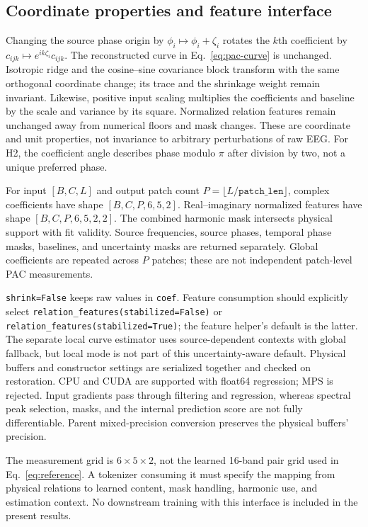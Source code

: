\documentclass[10pt,twocolumn,letterpaper]{article}
\begin{document}
\subsection{Coordinate properties and feature interface}
\label{app:operator-interface}
Changing the source phase origin by $\phi_i\mapsto\phi_i+\zeta_i$
rotates the $k$th coefficient by $c_{ijk}\mapsto
e^{ik\zeta_i}c_{ijk}$. The reconstructed curve in
Eq.~\ref{eq:pac-curve} is unchanged. Isotropic ridge and the
cosine--sine covariance block transform with the same orthogonal
coordinate change; its trace and the shrinkage weight remain invariant.
Likewise, positive input scaling multiplies the coefficients and
baseline by the scale and variance by its square. Normalized relation
features remain unchanged away from numerical floors and mask changes.
These are coordinate and unit properties, not invariance to arbitrary
perturbations of raw EEG. For H2, the coefficient angle describes phase
modulo $\pi$ after division by two, not a unique preferred phase.

For input $[B,C,L]$ and output patch count
$P=\lfloor L/\texttt{patch\_len}\rfloor$, complex coefficients have
shape $[B,C,P,6,5,2]$. Real--imaginary normalized features have shape
$[B,C,P,6,5,2,2]$. The combined harmonic mask intersects physical
support with fit validity. Source frequencies, source phases, temporal
phase masks, baselines, and uncertainty masks are returned separately.
Global coefficients are repeated across $P$ patches; these are not
independent patch-level PAC measurements.

\texttt{shrink=False} keeps raw values in \texttt{coef}. Feature
consumption should explicitly select
\texttt{relation\_features(stabilized=False)} or
\texttt{relation\_features(stabilized=True)}; the feature helper's
default is the latter. The separate local curve estimator uses
source-dependent contexts with global fallback, but local mode is not
part of this uncertainty-aware default. Physical buffers and constructor
settings are serialized together and checked on restoration.
CPU and CUDA are supported with float64 regression; MPS is rejected.
Input gradients pass through filtering and regression, whereas spectral
peak selection, masks, and the internal prediction score are not fully
differentiable. Parent mixed-precision conversion preserves the
physical buffers' precision.

The measurement grid is $6\times5\times2$, not the learned
16-band pair grid used in Eq.~\ref{eq:reference}. A tokenizer consuming
it must specify the mapping from physical relations to learned content,
mask handling, harmonic use, and estimation context. No downstream
training with this interface is included in the present results.
\end{document}

